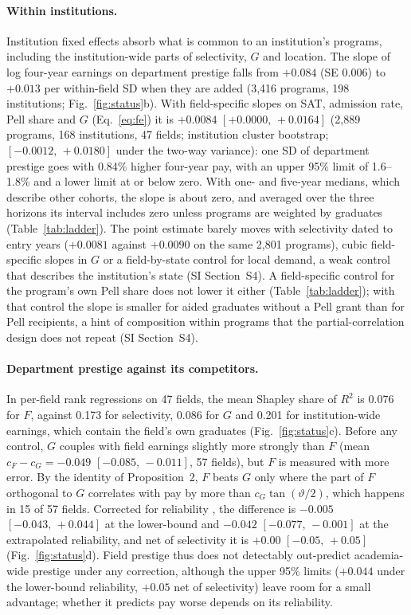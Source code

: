 \documentclass[11pt]{article}
\newcommand{\SI}[1]{SI Section~S#1}
\newcommand{\ci}[2]{$[#1,\allowbreak\,#2]$}
\begin{document}
\paragraph{Within institutions.} Institution fixed effects absorb what is common to an institution's programs, including the institution-wide
parts of selectivity, $G$ and location. The slope of log
four-year earnings on department prestige falls from $+0.084$ (SE 0.006) to $+0.013$ per within-field SD when they
are added (3,416 programs, 198 institutions; Fig.~\ref{fig:status}b). With field-specific slopes on SAT, admission
rate, Pell share and $G$ (Eq.~\ref{eq:fe}) it is $+0.0084$ \ci{+0.0000}{+0.0164} (2,889 programs, 168
institutions, 47 fields; institution cluster bootstrap; \ci{-0.0012}{+0.0180} under the two-way variance): one SD
of department prestige goes with 0.84\% higher four-year pay, with an upper 95\% limit of 1.6--1.8\% and a lower
limit at or below zero. With one- and five-year medians, which describe other cohorts, the slope is about zero, and averaged over the
three horizons its interval includes zero unless programs are weighted by graduates (Table~\ref{tab:ladder}). The point estimate barely moves with selectivity dated to entry years ($+0.0081$ against $+0.0090$ on the same
2,801 programs), cubic field-specific slopes in $G$ or a field-by-state control for local demand, a weak control
that describes the institution's state (\SI{4}). A field-specific control for the program's own Pell share does not lower it either (Table~\ref{tab:ladder}); with
that control the slope is smaller for aided graduates without a Pell grant than for Pell recipients, a hint of
composition within programs that the partial-correlation design does not repeat (\SI{4}).

\paragraph{Department prestige against its competitors.} In per-field rank regressions on 47 fields, the mean
Shapley share of $R^2$ \citep{budescu1993dominance, gromping2007estimators, shorrocks2013decomposition} is 0.076
for $F$, against 0.173 for selectivity, 0.086 for $G$ and 0.201 for institution-wide earnings, which contain the
field's own graduates (Fig.~\ref{fig:status}c). Before any control, $G$ couples with field earnings slightly more
strongly than $F$ (mean $c_F-c_G=-0.049$ \ci{-0.085}{-0.011}, 57 fields), but $F$ is measured with more error. By
the identity of Proposition~2, $F$ beats $G$ only where the part of $F$ orthogonal to $G$ correlates with pay by
more than $c_G\tan(\vartheta/2)$, which happens in 15 of 57 fields. Corrected for reliability
\citep{spearman1904proof}, the difference is $-0.005$ \ci{-0.043}{+0.044} at the lower-bound and $-0.042$
\ci{-0.077}{-0.001} at the extrapolated reliability, and net of selectivity it is $+0.00$ \ci{-0.05}{+0.05}
(Fig.~\ref{fig:status}d). Field prestige thus does not detectably out-predict academia-wide prestige under any
correction, although the upper 95\% limits ($+0.044$ under the lower-bound reliability, $+0.05$ net of
selectivity) leave room for a small advantage; whether it predicts pay worse depends on its reliability.
\end{document}
